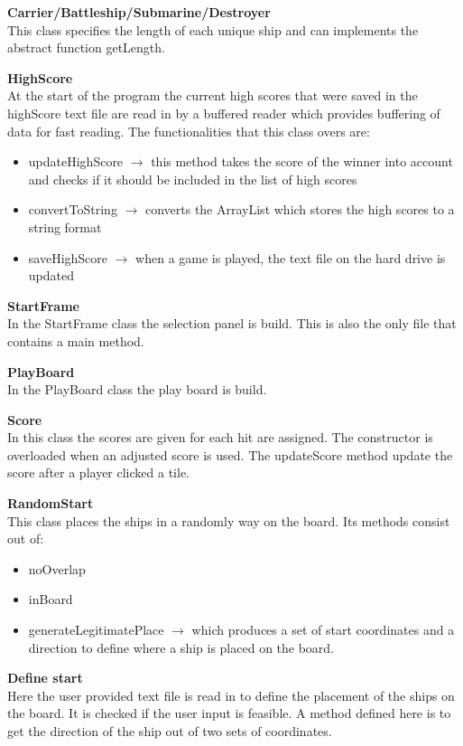 \documentclass[a4paper,10pt]{article}
\begin{document}
\textbf{Carrier/Battleship/Submarine/Destroyer}\\
This class specifies the length of each unique ship and can implements the abstract function getLength.

\textbf{HighScore}\\
At the start of the program the current high scores that were saved in the highScore text file are read in by a buffered reader which provides buffering of data for fast reading. The functionalities that this class overs are:

\begin{itemize}
	\item updateHighScore $ \rightarrow $ this method takes the score of the winner into account and checks if it should be included in the list of high scores
	\item convertToString $ \rightarrow $ converts the ArrayList which stores the high scores to a string format
	\item saveHighScore $ \rightarrow $ when a game is played, the text file on the hard drive is updated
\end{itemize}

\textbf{StartFrame}\\
In the StartFrame class the selection panel is build. This is also the only file that contains a main method.

\textbf{PlayBoard}\\
In the PlayBoard class the play board is build.

\textbf{Score}\\
In this class the scores are given for each hit are assigned. The constructor is overloaded when an adjusted score is used. 
The updateScore method update the score after a player clicked a tile.

\textbf{RandomStart}\\
This class places the ships in a randomly way on the board. Its methods consist out of:

\begin{itemize}
	\item noOverlap
	\item inBoard
	\item generateLegitimatePlace $ \rightarrow $ which produces a set of start coordinates and a direction to define where a ship is placed on the board.
\end{itemize}

\textbf{Define start}\\
Here the user provided text file is read in to define the placement of the ships on the board. It is checked if the user input is feasible. A method defined here is to get the direction of the ship out of two sets of coordinates. 
\end{document}
